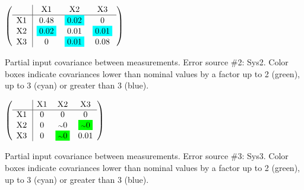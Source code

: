 \begin{table}[H]
\scriptsize
\begin{center}
\renewcommand{\arraystretch}{1.1}
\begin{math}\left(\begin{array}{c|ccc}
 & \mathrm{X1} & 
\mathrm{X2} & 
\mathrm{X3} \\
\hline
\mathrm{X1} \hspace*{2pt} &       0.48 &  \colorbox{Cyan1}{$      0.02$} &  0 \\
\mathrm{X2} \hspace*{2pt} &  \colorbox{Cyan1}{$      0.02$} &       0.01 &  \colorbox{Cyan1}{$      0.01$} \\
\mathrm{X3} \hspace*{2pt} &  0 &  \colorbox{Cyan1}{$      0.01$} &       0.08 \\
\end{array}\right)\end{math}
\caption{Partial input covariance between measurements. Error source \#2: Sys2. Color boxes indicate covariances lower than nominal values by a factor up to 2 (green), up to 3 (cyan) or greater than 3 (blue).}
\renewcommand{\arraystretch}{1}
\end{center}
\end{table}
\begin{table}[H]
\scriptsize
\begin{center}
\renewcommand{\arraystretch}{1.1}
\begin{math}\left(\begin{array}{c|ccc}
 & \mathrm{X1} & 
\mathrm{X2} & 
\mathrm{X3} \\
\hline
\mathrm{X1} \hspace*{2pt} &  0 &  0 &  0 \\
\mathrm{X2} \hspace*{2pt} &  0 &  {\scriptstyle \sim }0 &  \colorbox{Green1}{$ {\scriptstyle \sim }0$} \\
\mathrm{X3} \hspace*{2pt} &  0 &  \colorbox{Green1}{$ {\scriptstyle \sim }0$} &       0.01 \\
\end{array}\right)\end{math}
\caption{Partial input covariance between measurements. Error source \#3: Sys3. Color boxes indicate covariances lower than nominal values by a factor up to 2 (green), up to 3 (cyan) or greater than 3 (blue).}
\renewcommand{\arraystretch}{1}
\end{center}
\end{table}
\clearpage
